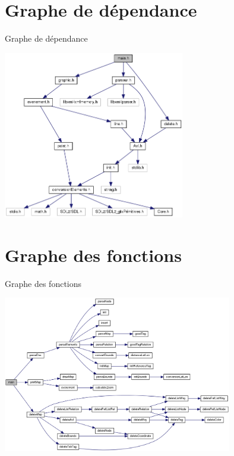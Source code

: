 \documentclass[french]{beamer}
\begin{document}
\section{Graphe de dépendance}
\begin{frame}{Graphe de dépendance}
	\begin{center}
	\includegraphics[width=7.9cm]{dependances.png}
	\end{center}
\end{frame}

\section{Graphe des fonctions}
\begin{frame}{Graphe des fonctions}
	\begin{center}
	\includegraphics[width=10cm]{fonctions.png}
	\end{center}
\end{frame}
\end{document}
